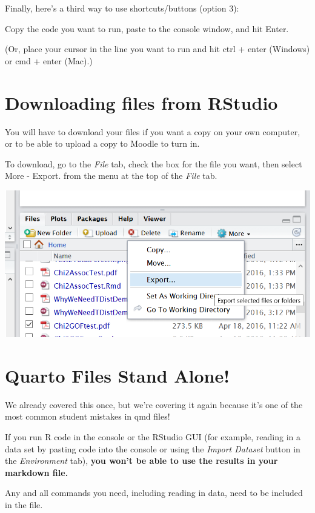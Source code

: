 \documentclass[
  letterpaper,
  DIV=11,
  numbers=noendperiod]{scrreprt}
\theoremstyle{remark}
\begin{document}
Finally, here's a third way to use shortcuts/buttons (option 3):

Copy the code you want to run, paste to the console window, and hit
Enter.

(Or, place your cursor in the line you want to run and hit ctrl + enter
(Windows) or cmd + enter (Mac).)

\section{Downloading files from
RStudio}\label{downloading-files-from-rstudio}

You will have to download your files if you want a copy on your own
computer, or to be able to upload a copy to Moodle to turn in.

To download, go to the \emph{File} tab, check the box for the file you
want, then select More - Export. from the menu at the top of the
\emph{File} tab.

\begin{center}
\includegraphics[width=0.85\linewidth,height=\textheight,keepaspectratio]{images/Export.png}
\end{center}

\section{Quarto Files Stand Alone!}\label{quarto-files-stand-alone}

We already covered this once, but we're covering it again because it's
one of the most common student mistakes in qmd files!

If you run R code in the console or the RStudio GUI (for example,
reading in a data set by pasting code into the console or using the
\emph{Import Dataset} button in the \emph{Environment} tab), \textbf{you
won't be able to use the results in your markdown file.}

Any and all commands you need, including reading in data, need to be
included in the file.
\end{document}
